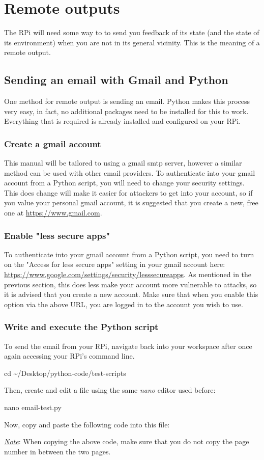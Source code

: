 \documentclass{article}
\newcommand*{\myfont}{\fontfamily{pcr}\selectfont}
\newcommand{\codeb}[2]{
  \begin{tcolorbox}[width=\textwidth,colback={SpringGreen},title={#1},colbacktitle=darkgreen,coltitle=SpringGreen]
    \myfont
    #2
  \end{tcolorbox}
} %
\newcommand{\note}[1]{\underline{\textit{Note}}: #1}
\begin{document}
\section{Remote outputs}
The RPi will need some way to to send you feedback of its state (and the state of its environment) when you are not in its general vicinity. This is the meaning of a remote output.
  \subsection{Sending an email with Gmail and Python}
  One method for remote output is sending an email. Python makes this process very easy, in fact, no additional packages need to be installed for this to work. Everything that is required is already installed and configured on your RPi.
    \subsubsection{Create a gmail account}
    This manual will be tailored to using a gmail smtp server, however a similar method can be used with other email providers. To authenticate into your gmail account from a Python script, you will need to change your security settings. This does change will make it easier for attackers to get into your account, so if you value your personal gmail account, it is suggested that you create a new, free one at \href{https://www.gmail.com}{https://www.gmail.com}.
    \subsubsection{Enable "less secure apps"}
    To authenticate into your gmail account from a Python script, you need to turn on the "Access for less secure apps" setting in your gmail account here: \href{https://www.google.com/settings/security/lesssecureapps}{https://www.google.com/settings/security/lesssecureapps}. As mentioned in the previous section, this does less make your account more vulnerable to attacks, so it is advised that you create a new account. Make sure that when you enable this option via the above URL, you are logged in to the account you wish to use.
    \subsubsection{Write and execute the Python script}
    To send the email from your RPi, navigate back into your workspace after once again accessing your RPi's command line.
    \codeb{Navigate to your workspace}
    {
      cd \textasciitilde/Desktop/python-code/test-scripts
    }
    Then, create and edit a file using the same \textit{nano} editor used before:
    \codeb{Create email Python testing script file}
    {
      nano email-test.py
    }
    Now, copy and paste the following code into this file:
    
    \note{When copying the above code, make sure that you do not copy the page number in between the two pages.}
\end{document}
